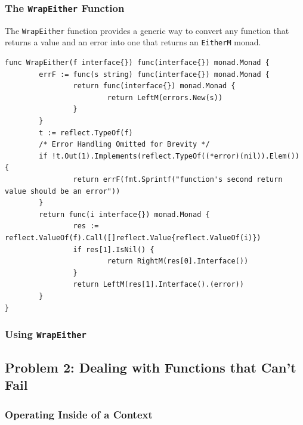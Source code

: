 \documentclass{beamer}
\begin{document}
\begin{frame}[fragile]
  \frametitle{The {\tt WrapEither} Function}
  The {\tt WrapEither} function provides a generic way to convert any
  function that returns a value and an error into one that returns an
  {\tt EitherM} monad.
  \\\vfill
  \par\pause
\begin{lstlisting}[language=Golang]
func WrapEither(f interface{}) func(interface{}) monad.Monad {
        errF := func(s string) func(interface{}) monad.Monad {
                return func(interface{}) monad.Monad {
                        return LeftM(errors.New(s))
                }
        }
        t := reflect.TypeOf(f)
        /* Error Handling Omitted for Brevity */
        if !t.Out(1).Implements(reflect.TypeOf((*error)(nil)).Elem()) {
                return errF(fmt.Sprintf("function's second return value should be an error"))
        }
        return func(i interface{}) monad.Monad {
                res := reflect.ValueOf(f).Call([]reflect.Value{reflect.ValueOf(i)})
                if res[1].IsNil() {
                        return RightM(res[0].Interface())
                }
                return LeftM(res[1].Interface().(error))
        }
}
\end{lstlisting}
\end{frame}

\begin{frame}[fragile]
  \frametitle{Using {\tt WrapEither}}

\end{frame}


\subsection{Problem 2: Dealing with Functions that Can't Fail}

\begin{frame}[fragile]
  \frametitle{Operating Inside of a Context}

\end{frame}
\end{document}
